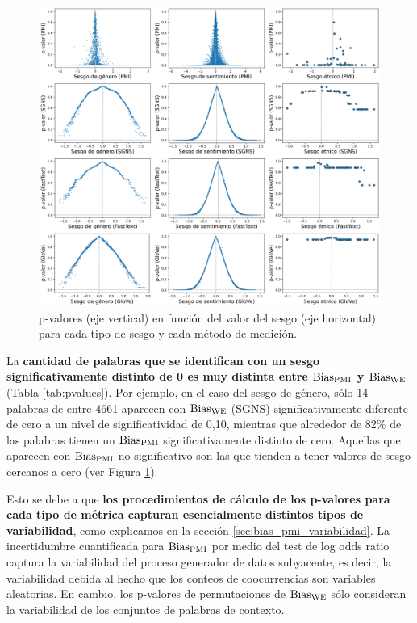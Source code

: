 

\begin{figure}[h]
    \centering
    \includegraphics[width=\textwidth]{img/grid_pvalues.png}
    \caption{
        p-valores (eje vertical) en función del valor del sesgo (eje horizontal) para cada tipo de sesgo y cada método de medición.
        }
    \label{fig:pvalues}
\end{figure}


La \textbf{cantidad de palabras que se identifican con un sesgo significativamente distinto de 0 es muy distinta entre $\operatorname{Bias_{PMI}}$ y $\operatorname{Bias_{WE}}$} (Tabla \ref{tab:pvalues}). Por ejemplo, en el caso del sesgo de género, sólo 14 palabras de entre 4661 aparecen con $\operatorname{Bias_{WE}}$ (SGNS) significativamente diferente de cero a un nivel de significatividad de 0,10, mientras que alrededor de 82\% de las palabras tienen un $\operatorname{Bias_{PMI}}$ significativamente distinto de cero. Aquellas que aparecen con $\operatorname{Bias_{PMI}}$ no significativo son las que tienden a tener valores de sesgo cercanos a cero (ver Figura \ref{fig:pvalues}).

Esto se debe a que \textbf{los procedimientos de cálculo de los p-valores para cada tipo de métrica capturan esencialmente distintos tipos de variabilidad}, como explicamos en la sección \ref{sec:bias_pmi_variabilidad}. La incertidumbre cuantificada para $\operatorname{Bias_{PMI}}$ por medio del test de log odds ratio captura la variabilidad del proceso generador de datos subyacente, es decir, la variabilidad debida al hecho que los conteos de coocurrencias son variables aleatorias. En cambio, los p-valores de permutaciones de $\operatorname{Bias_{WE}}$ sólo consideran la variabilidad de los conjuntos de palabras de contexto. 

